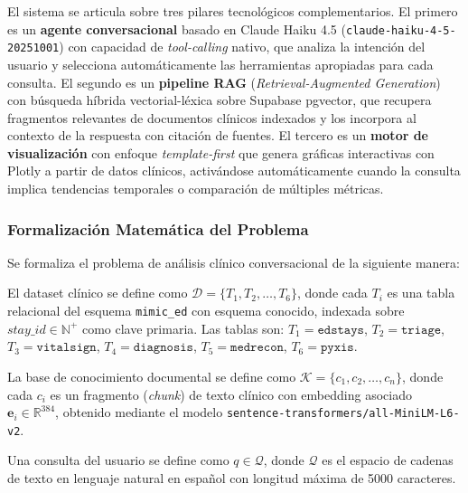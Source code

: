 El sistema se articula sobre tres pilares tecnológicos complementarios. El primero es un \textbf{agente conversacional} basado en Claude Haiku 4.5 (\texttt{claude-haiku-4-5-20251001}) con capacidad de \textit{tool-calling} nativo, que analiza la intención del usuario y selecciona automáticamente las herramientas apropiadas para cada consulta. El segundo es un \textbf{pipeline RAG} (\textit{Retrieval-Augmented Generation}) con búsqueda híbrida vectorial-léxica sobre Supabase pgvector, que recupera fragmentos relevantes de documentos clínicos indexados y los incorpora al contexto de la respuesta con citación de fuentes. El tercero es un \textbf{motor de visualización} con enfoque \textit{template-first} que genera gráficas interactivas con Plotly a partir de datos clínicos, activándose automáticamente cuando la consulta implica tendencias temporales o comparación de múltiples métricas.

\subsubsection{Formalización Matemática del Problema}
\label{sec:formalizacion}

Se formaliza el problema de análisis clínico conversacional de la siguiente manera:

\begin{definition}
\label{def:dataset}
El dataset clínico se define como $\mathcal{D} = \{T_1, T_2, \ldots, T_6\}$, donde cada $T_i$ es una tabla relacional del esquema \texttt{mimic\_ed} con esquema conocido, indexada sobre $\textit{stay\_id} \in \mathbb{N}^+$ como clave primaria. Las tablas son: $T_1 = \texttt{edstays}$, $T_2 = \texttt{triage}$, $T_3 = \texttt{vitalsign}$, $T_4 = \texttt{diagnosis}$, $T_5 = \texttt{medrecon}$, $T_6 = \texttt{pyxis}$.
\end{definition}

\begin{definition}
\label{def:rag}
La base de conocimiento documental se define como $\mathcal{K} = \{c_1, c_2, \ldots, c_n\}$, donde cada $c_i$ es un fragmento (\textit{chunk}) de texto clínico con embedding asociado $\mathbf{e}_i \in \mathbb{R}^{384}$, obtenido mediante el modelo \texttt{sentence-transformers/all-MiniLM-L6-v2}.
\end{definition}

\begin{definition}
\label{def:query}
Una consulta del usuario se define como $q \in \mathcal{Q}$, donde $\mathcal{Q}$ es el espacio de cadenas de texto en lenguaje natural en español con longitud máxima de 5000 caracteres.
\end{definition}

